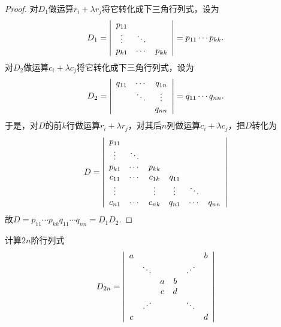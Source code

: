 \begin{frame} 
\begin{proof}
  对$D_1$做运算$r_i+\lambda r_j$将它转化成下三角行列式，设为
  $$
  D_1 =  \left|
    \begin{array}{ccc}
      p_{11} &       & \\
      \vdots    & \ddots  &  \\
      p_{k1} & \cdots   & p_{kk} 
    \end{array}
  \right| = p_{11} \cdots p_{kk}.
  $$ 
  对$D_2$做运算$c_i+\lambda c_j$将它转化成下三角行列式，设为
  $$
  D_2 =  \left|
    \begin{array}{ccc}
      q_{11} & \cdots  &  q_{1n}\\
             & \ddots  &  \vdots \\
             &      & q_{nn} \\
    \end{array}
  \right| = q_{11}\cdots q_{nn}.
  $$  
  于是，对$D$的前$k$行做运算$r_i+\lambda r_j$，对其后$n$列做运算$c_i+\lambda c_j$，把$D$转化为
  $$
  D = \left|
    \begin{array}{cccccc}
      p_{11} &      &  &    &    &   \\
      \vdots    & \ddots    &   &    &    &   \\
      p_{k1} & \cdots & p_{kk} &    &    &   \\
      c_{11} & \cdots & c_{1k} & q_{11}&  &    \\
      \vdots    &     & \vdots   & \vdots  &  \ddots  &  \\
      c_{n1} & \cdots & c_{nk} & q_{n1}&  \cdots & q_{nn}
    \end{array}
  \right|
  $$  
  故$D = p_{11}\cdots p_{kk} q_{11}\cdots q_{nn} = D_1 D_2$.
\end{proof}
%
\end{frame}

\begin{frame} 
\begin{testexample}
  计算$2n$阶行列式
  $$
  D_{2n} = \left|
    \begin{array}{cccccc}
      a &     & & & & b \\
        & \ddots & & & \iddots & \\
        &   & a & b &  & \\
        &   & c & d &  &  \\
        & \iddots & & & \ddots & \\
      c &     & & & & d
    \end{array}
  \right|
  $$
\end{testexample}
%
\end{frame}

